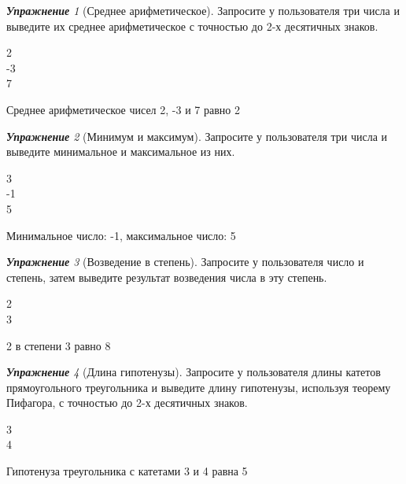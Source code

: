 \documentclass[a4,12pt]{article}
\theoremstyle{remark}
\newtheorem{exercise}{\textbf{Упражнение}}[section]
\begin{document}
\begin{exercise}[Среднее арифметическое]
Запросите у пользователя три числа и выведите их среднее арифметическое с точностью до 2-х десятичных знаков.

\begin{inputformat}
2\\
-3\\
7
\end{inputformat}

\begin{outputformat}
Среднее арифметическое чисел 2, -3 и 7 равно 2
\end{outputformat}
\end{exercise}

\begin{exercise}[Минимум и максимум]
Запросите у пользователя три числа и выведите минимальное и максимальное из них.

\begin{inputformat}
3\\
-1\\
5
\end{inputformat}

\begin{outputformat}
Минимальное число: -1, максимальное число: 5
\end{outputformat}
\end{exercise}

\begin{exercise}[Возведение в степень]
Запросите у пользователя число и степень, затем выведите результат возведения числа в эту степень. 

\begin{inputformat}
2\\
3
\end{inputformat}

\begin{outputformat}
2 в степени 3 равно 8
\end{outputformat}
\end{exercise}

\begin{exercise}[Длина гипотенузы]
Запросите у пользователя длины катетов прямоугольного треугольника и выведите длину гипотенузы, используя теорему Пифагора, с точностью до 2-х десятичных знаков.

\begin{inputformat}
3\\
4
\end{inputformat}

\begin{outputformat}
Гипотенуза треугольника с катетами 3 и 4 равна 5
\end{outputformat}
\end{exercise}
\end{document}
